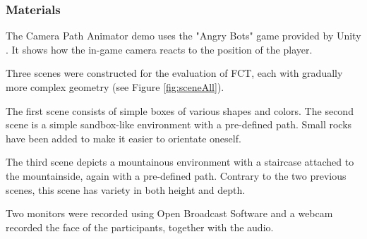 \subsubsection{Materials}
The Camera Path Animator \cite{unity_camTool} demo uses the "Angry Bots" game provided by Unity \cite{angryBots}. It shows how the in-game camera reacts to the position of the player.


Three scenes were constructed for the evaluation of FCT, each with gradually more complex geometry (see Figure \ref{fig:sceneAll}). 

The first scene consists of simple boxes of various shapes and colors.
The second scene is a simple sandbox-like environment with a pre-defined path. Small rocks have been added to make it easier to orientate oneself.


The third scene depicts a mountainous environment with a staircase attached to the mountainside, again with a pre-defined path. Contrary to the two previous scenes, this scene has variety in both height and depth.

Two monitors were recorded using Open Broadcast Software \cite{obs_cam} and a webcam recorded the face of the participants, together with the audio.


